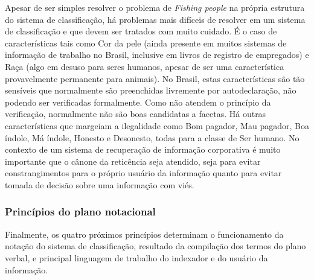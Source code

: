 Apesar de ser simples resolver o problema de \textit{Fishing people} na própria estrutura do sistema de classificação, há problemas mais difíceis de resolver em um sistema de classificação e que devem ser tratados com muito cuidado. É o caso de características tais como Cor da pele (ainda presente em muitos sistemas de informação de trabalho no Brasil, inclusive em livros de registro de empregados) e Raça (algo em desuso para seres humanos, apesar de ser uma característica provavelmente permanente para animais). No Brasil, estas características são tão sensíveis que normalmente são preenchidas livremente por autodeclaração, não podendo ser verificadas formalmente. Como não atendem o princípio da verificação, normalmente não são boas candidatas a facetas. Há outras características que margeiam a ilegalidade como Bom pagador, Mau pagador, Boa índole, Má índole, Honesto e Desonesto, todas para a classe de Ser humano. No contexto de um sistema de recuperação de informação corporativa é muito importante que o cânone da reticência seja atendido, seja para evitar constrangimentos para o próprio usuário da informação quanto para evitar tomada de decisão sobre uma informação com viés.


\subsubsection{Princípios do plano notacional}

Finalmente, os quatro próximos princípios determinam o funcionamento da notação do sistema de classificação, resultado da compilação dos termos do plano verbal, e principal linguagem de trabalho do indexador e do usuário da informação.

